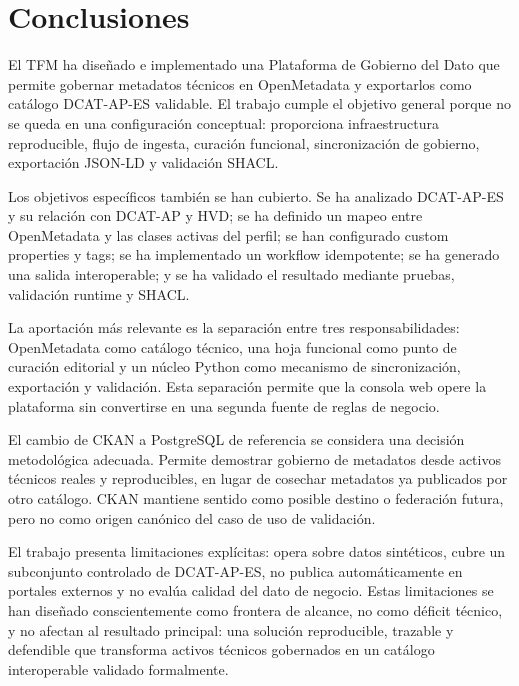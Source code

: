 \chapter{Conclusiones}

El TFM ha diseñado e implementado una Plataforma de Gobierno del Dato que permite gobernar metadatos técnicos en OpenMetadata y exportarlos como catálogo DCAT-AP-ES validable. El trabajo cumple el objetivo general porque no se queda en una configuración conceptual: proporciona infraestructura reproducible, flujo de ingesta, curación funcional, sincronización de gobierno, exportación JSON-LD y validación SHACL.

Los objetivos específicos también se han cubierto. Se ha analizado DCAT-AP-ES y su relación con DCAT-AP y HVD; se ha definido un mapeo entre OpenMetadata y las clases activas del perfil; se han configurado custom properties y tags; se ha implementado un workflow idempotente; se ha generado una salida interoperable; y se ha validado el resultado mediante pruebas, validación runtime y SHACL.

La aportación más relevante es la separación entre tres responsabilidades: OpenMetadata como catálogo técnico, una hoja funcional como punto de curación editorial y un núcleo Python como mecanismo de sincronización, exportación y validación. Esta separación permite que la consola web opere la plataforma sin convertirse en una segunda fuente de reglas de negocio.

El cambio de CKAN a PostgreSQL de referencia se considera una decisión metodológica adecuada. Permite demostrar gobierno de metadatos desde activos técnicos reales y reproducibles, en lugar de cosechar metadatos ya publicados por otro catálogo. CKAN mantiene sentido como posible destino o federación futura, pero no como origen canónico del caso de uso de validación.

El trabajo presenta limitaciones explícitas: opera sobre datos sintéticos, cubre un subconjunto controlado de DCAT-AP-ES, no publica automáticamente en portales externos y no evalúa calidad del dato de negocio. Estas limitaciones se han diseñado conscientemente como frontera de alcance, no como déficit técnico, y no afectan al resultado principal: una solución reproducible, trazable y defendible que transforma activos técnicos gobernados en un catálogo interoperable validado formalmente.
